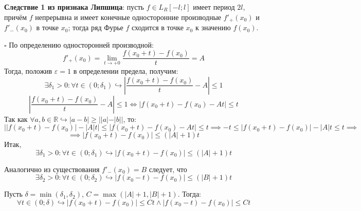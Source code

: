 \documentclass[12pt, a4paper, reqno]{article}
\begin{document}
    \textbf{Следствие 1 из признака Липшица}: пусть $f \in L_R[-l; l]$ имеет период $2l$, причём
    $f$ непрерывна и имеет конечные односторонние производные $f'_{+}(x_0)$ и $f'_{-}(x_0)$ в точке
    $x_0$; тогда ряд Фурье $f$ сходится в точке $x_0$ к значению $f(x_0)$.

    $\square$ По определению односторонней производной:
    \begin{equation*}
        f'_{+}(x_0) = \lim\limits_{t \to +0}\frac{f(x_0 + t) - f(x_0)}{t} = A
    \end{equation*}
    Тогда, положив $\varepsilon = 1$ в определении предела, получим:
    \begin{equation*}
        \exists \delta_1 > 0: \forall t \in (0; \delta_1) \hookrightarrow
        \left|\frac{f(x_0 + t) - f(x_0)}{t} - A\right| \leq 1
    \end{equation*}
    \begin{equation*}
        \left|\frac{f(x_0 + t) - f(x_0)}{t} - A\right| \leq 1 \iff
        |f(x_0 + t) - f(x_0) - At| \leq t
    \end{equation*}
    Так как $\forall a, b \in \mathbb{R} \hookrightarrow |a - b| \geq ||a| - |b||$, то:
    \begin{equation*}
        \Big||f(x_0 + t) - f(x_0)| - |A|t\Big|\leq |f(x_0 + t) - f(x_0) - At| \leq t \implies
        -t \leq |f(x_0 + t) - f(x_0)| - |A|t \leq t \implies
    \end{equation*}
    \begin{equation*}
        \implies |f(x_0 + t) - f(x_0)| \leq (|A| + 1)t
    \end{equation*}
    Итак,
    \begin{equation*}
        \exists \delta_1 > 0: \forall t \in (0; \delta_1) \hookrightarrow
        |f(x_0 + t) - f(x_0)| \leq (|A| + 1)t
    \end{equation*}

    Аналогично из существования $f'_{-}(x_0) = B$ следует, что
    \begin{equation*}
        \exists \delta_2 > 0: \forall t \in (0; \delta_2) \hookrightarrow
        |f(x_0 - t) - f(x_0)| \leq (|B| + 1)t
    \end{equation*}

    Пусть $\delta = \min(\delta_1, \delta_2)$, $C = \max(|A| + 1, |B| + 1)$. Тогда:
    \begin{equation*}
        \forall t \in (0; \delta) \hookrightarrow |f(x_0 + t) - f(x_0)| \leq Ct \wedge
        |f(x_0 - t) - f(x_0)| \leq Ct
    \end{equation*}
\end{document}
